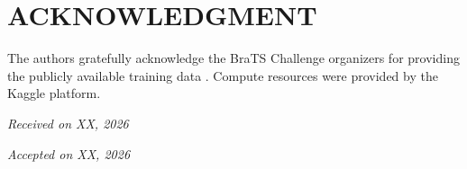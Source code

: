 \section*{ACKNOWLEDGMENT}

The authors gratefully acknowledge the BraTS Challenge organizers for providing the publicly available training data \cite{menze2014brats,bakas2017brats}. Compute resources were provided by the Kaggle platform.



\hfill {\it Received on XX, 2026}

\hfill {\it Accepted on XX, 2026}

